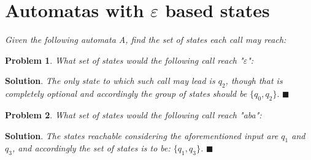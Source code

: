 \documentclass[12pt]{article}
\renewcommand{\=}[1]{\stackrel{#1}{=}} %
\newtheorem{p}{Problem}[section]
\theoremstyle{definition}
\newenvironment{s}{%
        \begin{trivlist} \item \textbf{Solution}. }{%
            \hspace*{\fill} $\blacksquare$\end{trivlist}}%
\begin{document}
\section{Automatas with $\varepsilon$ based states}
\emph{\newline Given the following automata A, find the set of states each call may reach:} \newline
  \\
\begin{p}
\emph{What set of states would the following call reach "$\varepsilon$":} \newline
\end{p}
\begin{s} \newline
  \emph{The only state to which such call may lead is $q_2$, though that is completely optional and accordingly the group of states should be $\{q_0, q_2\}.$}
\end{s}
\begin{p}
\emph{What set of states would the following call reach "aba":} \newline
\end{p}
\begin{s} \newline
  \emph{The states reachable considering the aforementioned input are $q_1$ and $q_3$, and accordingly the set of states is to be: $\{q_1, q_3\}$.}
\end{s}
\end{document}
